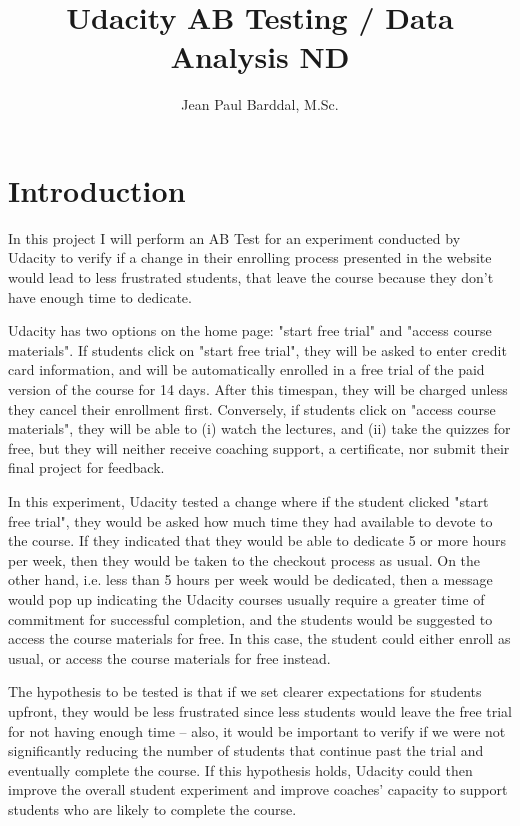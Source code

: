 \documentclass[11pt]{article}
\begin{document}
\title{Udacity AB Testing / Data Analysis ND}
\author{Jean Paul Barddal, M.Sc.}
\maketitle

\section{Introduction}

	In this project I will perform an AB Test for an experiment conducted by Udacity to verify if a change in their enrolling process presented in the website would lead to less frustrated students, that leave the course because they don't have enough time to dedicate.
	
	Udacity has two options on the home page: "start free trial" and "access course materials".
	If students click on "start free trial", they will be asked to enter credit card information, and will be automatically enrolled in a free trial of the paid version of the course for 14 days.
	After this timespan, they will be charged unless they cancel their enrollment first.
	Conversely, if students click on "access course materials", they will be able to (i) watch the lectures, and (ii) take the quizzes for free, but they will neither receive coaching support, a certificate, nor submit their final project for feedback.
	
	In this experiment, Udacity tested a change where if the student clicked "start free trial", they would be asked how much time they had available to devote to the course.
	If they indicated that they would be able to dedicate 5 or more hours per week, then they would be taken to the checkout process as usual.
	On the other hand, i.e. less than 5 hours per week would be dedicated, then a message would pop up indicating the Udacity courses usually require a greater time of commitment for successful completion, and the students would be suggested to access the course materials for free.
	In this case, the student could either enroll as usual, or access the course materials for free instead.
	
	The hypothesis to be tested is that if we set clearer expectations for students upfront, they would be less frustrated since less students would leave the free trial for not having enough time -- also, it would be important to verify if we were not significantly reducing the number of students that continue past the trial and eventually complete the course.
	If this hypothesis holds, Udacity could then improve the overall student experiment and improve coaches' capacity to support students who are likely to complete the course.
	
\end{document}
